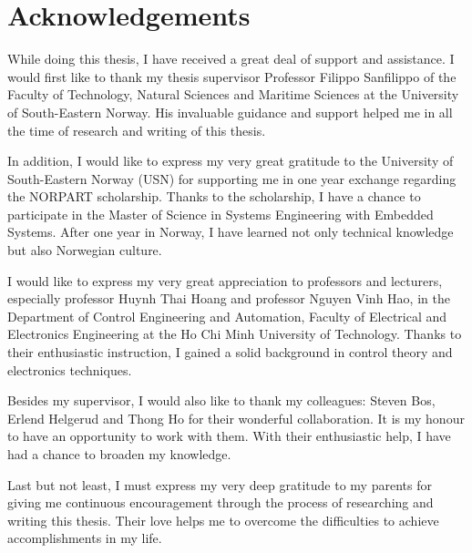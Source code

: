 \documentclass[../../main.tex]{subfiles}
\begin{document}
\chapter*{Acknowledgements}
While doing this thesis, I have received a great deal of support and assistance. I would first like to thank my thesis supervisor Professor Filippo Sanfilippo of the Faculty of Technology, Natural Sciences and Maritime Sciences at the University of South-Eastern Norway. His invaluable guidance and support helped me in all the time of research and writing of this thesis.

In addition, I would like to express my very great gratitude to the University of South-Eastern Norway (USN) for supporting me in one year exchange regarding the NORPART scholarship. Thanks to the scholarship, I have a chance to participate in the Master of Science in Systems Engineering with Embedded Systems. After one year in Norway, I have learned not only technical knowledge but also Norwegian culture.

I would like to express my very great appreciation to professors and lecturers, especially professor Huynh Thai Hoang and professor Nguyen Vinh Hao, in the Department of Control Engineering and Automation, Faculty of Electrical and Electronics Engineering at the Ho Chi Minh University of Technology. Thanks to their enthusiastic instruction, I gained a solid background in control theory and electronics techniques.

Besides my supervisor, I would also like to thank my colleagues: Steven Bos, Erlend Helgerud and Thong Ho for their wonderful collaboration. It is my honour to have an opportunity to work with them. With their enthusiastic help, I have had a chance to broaden my knowledge.

Last but not least, I must express my very deep gratitude to my parents for giving me continuous encouragement through the process of researching and writing this thesis. Their love helps me to overcome the difficulties to achieve accomplishments in my life.
\end{document}
